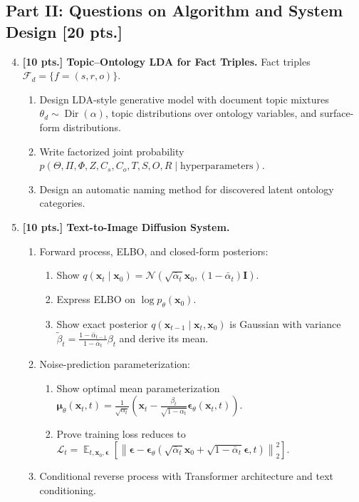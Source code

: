 \documentclass[11pt,a4paper]{article}
\DeclareMathOperator{\E}{\mathbb{E}}
\begin{document}
\subsection*{Part II: Questions on Algorithm and System Design [20 pts.]}

\begin{enumerate}[label=\textbf{\arabic*.}]\setcounter{enumii}{3}
    \item \textbf{[10 pts.] Topic--Ontology LDA for Fact Triples.}
    Fact triples $\mathcal{F}_d = \{f = (s, r, o)\}$.
    \begin{enumerate}[label=(\alph*)]
        \item Design LDA-style generative model with document topic mixtures $\theta_d \sim \operatorname{Dir}(\alpha)$, topic distributions over ontology variables, and surface-form distributions.
        \item Write factorized joint probability $p(\Theta, \Pi, \Phi, Z, C_s, C_o, T, S, O, R \mid \text{hyperparameters})$.
        \item Design an automatic naming method for discovered latent ontology categories.
    \end{enumerate}

    \item \textbf{[10 pts.] Text-to-Image Diffusion System.}
    \begin{enumerate}[label=(\alph*)]
        \item Forward process, ELBO, and closed-form posteriors:
        \begin{enumerate}[label=(\roman*)]
            \item Show $q(\mathbf{x}_t \mid \mathbf{x}_0) = \mathcal{N}\left(\sqrt{\bar{\alpha}_t} \mathbf{x}_0, (1 - \bar{\alpha}_t)\mathbf{I}\right)$.
            \item Express ELBO on $\log p_\theta(\mathbf{x}_0)$.
            \item Show exact posterior $q(\mathbf{x}_{t-1} \mid \mathbf{x}_t, \mathbf{x}_0)$ is Gaussian with variance $\tilde{\beta}_t = \frac{1 - \bar{\alpha}_{t-1}}{1 - \bar{\alpha}_t} \beta_t$ and derive its mean.
        \end{enumerate}
        \item Noise-prediction parameterization:
        \begin{enumerate}[label=(\roman*)]
            \item Show optimal mean parameterization $\boldsymbol{\mu}_\theta(\mathbf{x}_t, t) = \frac{1}{\sqrt{\alpha_t}} \left( \mathbf{x}_t - \frac{\beta_t}{\sqrt{1 - \bar{\alpha}_t}} \boldsymbol{\epsilon}_\theta(\mathbf{x}_t, t) \right)$.
            \item Prove training loss reduces to $\mathcal{L}_t = \E_{t, \mathbf{x}_0, \boldsymbol{\epsilon}} \left[ \left\| \boldsymbol{\epsilon} - \boldsymbol{\epsilon}_\theta\left(\sqrt{\bar{\alpha}_t} \mathbf{x}_0 + \sqrt{1 - \bar{\alpha}_t}\boldsymbol{\epsilon}, t\right) \right\|_2^2 \right]$.
        \end{enumerate}
        \item Conditional reverse process with Transformer architecture and text conditioning.
    \end{enumerate}
\end{enumerate}
\end{document}
